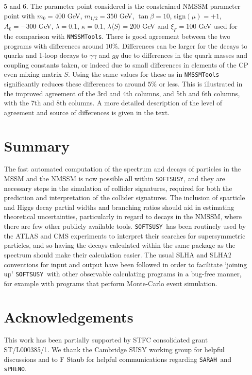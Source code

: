 \documentclass[final,3p,times]{elsarticle}
\def\code#1{{\tt #1}}
\begin{document}
\begin{center}
\begin{table}
{  5 and 6. The 
  parameter point considered is the
constrained NMSSM
  parameter point  with $m_0 =
  400$ GeV, $m_{1/2} = 350$ GeV, 
  $\tan\beta = 10$, sign$(\mu) = +1$, $A_0 = -300$ GeV, $\lambda = 0.1$,
  $\kappa = 
  0.1$, $\lambda \langle S \rangle = 200$ GeV and $\xi_F = 100$ GeV
used for the comparison with {\tt NMSSMTools}.
There is good agreement between the two
  programs with differences around $10\%$. Differences can be larger for the
  decays to quarks and 1-loop decays to $\gamma \gamma$ and $gg$ due to
  differences in the quark masses and coupling constants taken, or indeed due to small
  differences in elements of the CP even mixing matrix $S$. Using the same
  values for these as in {\tt NMSSMTools} significantly reduces these
  differences to around $5\%$ or less. This is illustrated in the improved
  agreement of the 3rd 
  and 4th columns, and 5th and 6th columns, with the 7th and 8th columns. A
  more detailed description of 
  the level of agreement and source of differences is given in the text.} 
\label{nmssmSLHAnoZ3Inputspctable}
\end{table}
\end{center}
       



\section{Summary} \label{sec:sum}
The fast automated computation of the spectrum and decays of particles in the
MSSM and the NMSSM is now possible all within \code{SOFTSUSY}, and they are
necessary steps in the simulation of collider signatures, required for both
the prediction and interpretation of the collider signatures. The inclusion
of sparticle and Higgs decay partial widths and branching ratios should aid in
estimating 
theoretical uncertainties, particularly in regard to decays in the NMSSM,
where there are few other publicly available tools. 
\code{SOFTSUSY}~has been routinely used by the ATLAS and CMS experiments to
interpret their searches for supersymmetric particles, and so having the
decays calculated within the same package as the spectrum should make their
calculation easier. 
The usual SLHA and SLHA2
conventions for input and output have been followed in order to facilitate
`joining up' \code{SOFTSUSY}~with other observable calculating programs in a
bug-free manner, for example with programs that perform Monte-Carlo event
simulation. 

\section*{Acknowledgements}
This work has been partially supported by STFC consolidated grant 
ST/L000385/1. We thank the Cambridge SUSY working group for helpful
discussions and to F Staub for helpful communications regarding
\code{SARAH}~and \code{sPHENO}.
\end{document}
